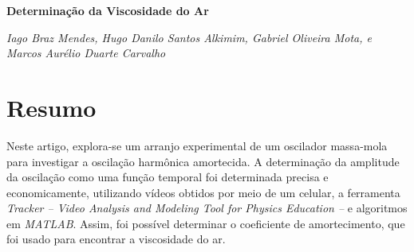 \documentclass[a4paper, 12pt]{article}
\begin{document}
	\begin{center}
	\begin{large}
		\textbf{Determinação da Viscosidade do Ar}	
	\end{large}
	\end{center}
	
	\begin{center}
		\textit{Iago Braz Mendes, Hugo Danilo Santos Alkimim, Gabriel Oliveira Mota, e Marcos Aurélio Duarte Carvalho}
	\end{center}

	\section*{Resumo}
		Neste artigo, explora-se um arranjo experimental de um oscilador massa-mola para investigar a oscilação harmônica amortecida. A determinação da amplitude da oscilação como uma função temporal foi determinada precisa e economicamente, utilizando vídeos obtidos por meio de um celular, a ferramenta \textit{Tracker -- Video Analysis and Modeling Tool for Physics Education --} e algoritmos em \textit{MATLAB}. Assim, foi possível determinar o coeficiente de amortecimento, que foi usado para encontrar a viscosidade do ar.
	
\end{document}
